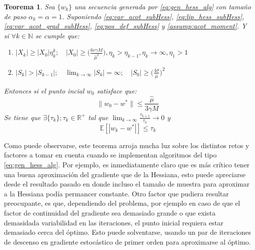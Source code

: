 \documentclass{book}
\theoremstyle{plain}
\newtheorem{thm}{Teorema}[section]
\theoremstyle{definition}
\theoremstyle{remark}
\begin{document}
\begin{thm}
Sea $\{w_k\}$ una secuencia generada por \ref{eq:gen_hess_alg} con tamaño de paso $\alpha_k= \alpha = 1$. Suponiendo \ref{eq:var_acot_subHess}, \ref{eq:lip_hess_subHess}, \ref{eq:var_acot_grad_subHess}, \ref{eq:pos_def_subHess} y \ref{assump:acot_moment}. Y si $\forall k \in \mathbb{N}$ se cumple que:
\begin{enumerate}[topsep=0pt,partopsep=0ex,parsep=0ex]
\item $|X_k| \geq |X_0|\eta_k^k;\quad |X_0|\geq\bigg(\frac{6v\gamma M}{\hat{\mu}^2}\bigg), \eta_k > \eta_{k-1}, \eta_k \rightarrow\infty, \eta_1>1$
\item $|S_k| > |S_{k-1}|;\quad \displaystyle\lim_{k\rightarrow\infty}|S_k|=\infty; \quad |S_0|\geq\bigg(\frac{4\sigma}{\hat{\mu}}\bigg)^2$
\end{enumerate}
Entonces si el punto incial $w_0$ satisface que:
\begin{equation*}
    \|w_0-w^*\|\leq\frac{\hat{\mu}}{3\gamma M}
\end{equation*}
Se tiene que $\exists \{\tau_k\};\tau_k\in\mathbb{R}^+$ tal que $\displaystyle\lim_{k\rightarrow\infty}\frac{\tau_{k+1}}{\tau_k}\rightarrow 0$ y
\begin{equation}
    \mathbb{E}[|w_k - w^*|]\leq\tau_k
\end{equation}
\end{thm}
Como puede observarse, este teorema arroja mucha luz sobre los distintos retos y factores a tomar en cuenta cuando se implementan algoritmos del tipo \ref{eq:gen_hess_alg}. Por ejemplo, es inmediatamente claro que es más crítico tener una buena aproximación del gradiente que de la Hessiana, esto puede apreciarse desde el resultado pasado en donde incluso el tamaño de muestra para aproximar a la Hessiana podía permancer constante. Otro factor que pudiera resultar preocupante, es que, dependiendo del problema, por ejemplo en caso de que el factor de continuidad del gradiente sea demasiado grande o que exista demasidada variabilidad en las iteraciones, el punto inicial requiera estar demasiado cerca del óptimo. Esto puede solventarse, usando un par de iteraciones de descenso en gradiente estocástico de primer orden \cite{BOTTOU} para aproximarse al óptimo.
\end{document}

